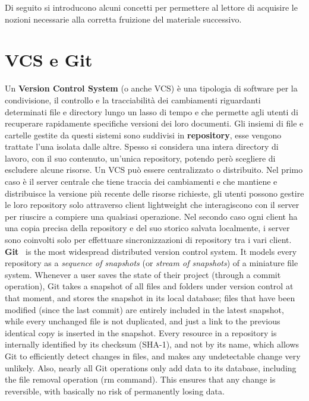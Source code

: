 Di seguito si introducono alcuni concetti 
per permettere al lettore di acquisire le nozioni necessarie alla
corretta fruizione del materiale successivo.

\section{VCS e Git}
\label{sub:vcs}
Un \textbf{Version Control System} (o anche VCS) è una tipologia di software per la condivisione,
il controllo e la tracciabilità dei cambiamenti riguardanti determinati file e directory
lungo un lasso di tempo e che permette agli utenti di recuperare rapidamente specifiche
versioni dei loro documenti. Gli insiemi di file e cartelle gestite da questi sistemi
sono suddivisi in \textbf{repository}, esse vengono trattate l’una isolata dalle altre.
Spesso si considera una intera directory di lavoro, con il suo contenuto,
un’unica repository, potendo però scegliere di escludere alcune risorse.
Un VCS può essere centralizzato o distribuito.
Nel primo caso è il server centrale che tiene traccia dei cambiamenti e che mantiene e
distribuisce la versione più recente delle risorse richieste, gli utenti possono gestire
le loro repository solo attraverso client lightweight che interagiscono con il server
per riuscire a compiere una qualsiasi operazione.
Nel secondo caso ogni client ha una copia precisa della repository e del suo storico
salvata localmente, i server sono coinvolti solo per effettuare sincronizzazioni
di repository tra i vari client.
\\ 
\label{sub:git}
\textbf{Git}~\cite{git-21} is the most widespread distributed version control system.
It models every repository as a \emph{sequence of snapshots} (or \emph{stream of snapshots}) of a miniature file system. Whenever a user saves the state of their project (through a \textsf{commit} operation), Git takes a snapshot of all files and folders under version control at that moment, and stores the snapshot in its local database; files that have been modified (since the last commit) are entirely included in the latest snapshot, while every unchanged file is not duplicated, and just a link to the previous identical copy is inserted in the snapshot.
Every resource in a repository is internally identified by its checksum (SHA-1), and not by its name, which allows Git to efficiently detect changes in files, and makes any undetectable change very unlikely.
Also, nearly all Git operations only add data to its database, including the file removal operation (\textsf{rm} command). This ensures that any change is reversible, with basically no risk of permanently losing data.
